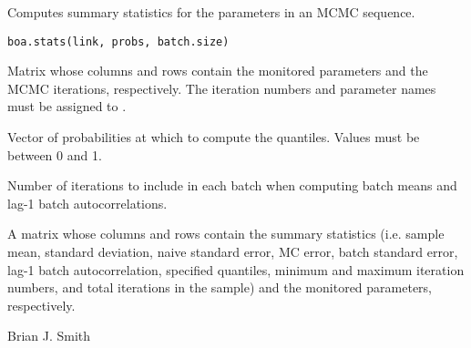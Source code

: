 \begin{Description}\relax
Computes summary statistics for the parameters in an MCMC sequence.
\end{Description}
\begin{Usage}
\begin{verbatim}
boa.stats(link, probs, batch.size)
\end{verbatim}
\end{Usage}
\begin{Arguments}
\begin{ldescription}
\item[\code{link}] Matrix whose columns and rows contain the monitored parameters 
and the MCMC iterations, respectively. The iteration numbers and parameter 
names must be assigned to .
\item[\code{probs}] Vector of probabilities at which to compute the quantiles. 
Values must be between 0 and 1.
\item[\code{batch.size}] Number of iterations to include in each batch when 
computing batch means and lag-1 batch autocorrelations.
\end{ldescription}
\end{Arguments}
\begin{Value}
A matrix whose columns and rows contain the summary statistics (i.e. sample 
mean, standard deviation, naive standard error, MC error, batch standard error, 
lag-1 batch autocorrelation, specified quantiles, minimum and maximum iteration 
numbers, and total iterations in the sample) and the monitored parameters, 
respectively.
\end{Value}
\begin{Author}\relax
Brian J. Smith
\end{Author}
\begin{SeeAlso}\relax
{}
\end{SeeAlso}

